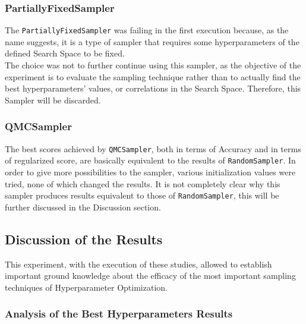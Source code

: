 \subsubsection{PartiallyFixedSampler}

The \texttt{PartiallyFixedSampler} was failing in the first execution because, as the name suggests, it is a type of sampler that requires some hyperparameters of the defined Search Space to be fixed.
\\[0.3cm]The choice was not to further continue using this sampler, as the objective of the experiment is to evaluate the sampling technique rather than to actually find the best hyperparameters' values, or correlations in the Search Space.
Therefore, this Sampler will be discarded.

\subsubsection{QMCSampler}

The best scores achieved by \texttt{QMCSampler}, both in terms of Accuracy and in terms of regularized score, are basically equivalent to the results of \texttt{RandomSampler}.
In order to give more possibilities to the sampler, various initialization values were tried, none of which changed the results.
It is not completely clear why this sampler produces results equivalent to those of \texttt{RandomSampler}, this will be further discussed in the Discussion section.

\subsection{Discussion of the Results}

This experiment, with the execution of these studies, allowed to establish important ground knowledge about the efficacy of the most important sampling techniques of Hyperparameter Optimization.

\subsubsection{Analysis of the Best Hyperparameters Results}

